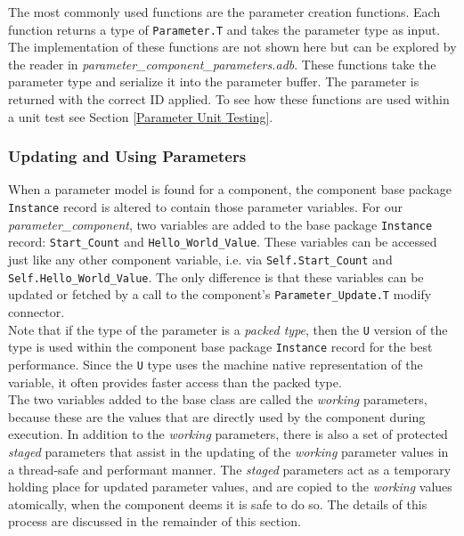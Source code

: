 The most commonly used functions are the parameter creation functions. Each function returns a type of \texttt{Parameter.T} and takes the parameter type as input. The implementation of these functions are not shown here but can be explored by the reader in \textit{parameter\_component\_parameters.adb}. These functions take the parameter type and serialize it into the parameter buffer. The parameter is returned with the correct ID applied. To see how these functions are used within a unit test see Section \ref{Parameter Unit Testing}.

\subsubsection{Updating and Using Parameters}

When a parameter model is found for a component, the component base package \texttt{Instance} record is altered to contain those parameter variables. For our \textit{parameter\_component}, two variables are added to the base package \texttt{Instance} record: \texttt{Start\_Count} and \texttt{Hello\_World\_Value}. These variables can be accessed just like any other component variable, i.e. via \texttt{Self.Start\_Count} and \texttt{Self.Hello\_World\_Value}. The only difference is that these variables can be updated or fetched by a call to the component's \texttt{Parameter\_Update.T} modify connector. \\

Note that if the type of the parameter is a \textit{packed type}, then the \texttt{U} version of the type is used within the component base package \texttt{Instance} record for the best performance. Since the \texttt{U} type uses the machine native representation of the variable, it often provides faster access than the packed type. \\

The two variables added to the base class are called the \textit{working} parameters, because these are the values that are directly used by the component during execution. In addition to the \textit{working} parameters, there is also a set of protected \textit{staged} parameters that assist in the updating of the \textit{working} parameter values in a thread-safe and performant manner. The \textit{staged} parameters act as a temporary holding place for updated parameter values, and are copied to the \textit{working} values atomically, when the component deems it is safe to do so. The details of this process are discussed in the remainder of this section. \\

